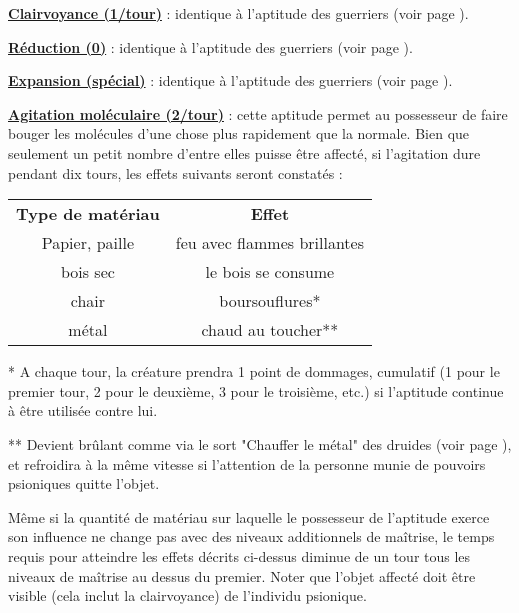 \bigskip

\textbf{\uline{Clairvoyance (1/tour)}} : identique à l'aptitude des guerriers (voir page \pageref{guerrier-clairvoyance}).

\bigskip

\textbf{\uline{Réduction (0)}} : identique à l'aptitude des guerriers (voir page \pageref{guerrier-reduction}).

\bigskip

\textbf{\uline{Expansion (spécial)}} : identique à l'aptitude des guerriers (voir page \pageref{guerrier-expansion}).

\bigskip

\label{magicien-agitation-mol}\textbf{\uline{Agitation moléculaire (2/tour)}} : cette aptitude permet au possesseur de faire bouger les molécules d'une chose plus rapidement que la normale. Bien que seulement un petit nombre d'entre elles puisse être affecté, si l'agitation dure pendant dix tours, les effets suivants seront constatés :

\medskip

\begin{tabular}{cc}
\textbf{Type de matériau}   & \textbf{Effet} \\
Papier, paille              & feu avec flammes brillantes \\
bois sec                    & le bois se consume \\
chair                       & boursouflures* \\
métal                       & chaud au toucher** \\
\end{tabular}

\bigskip

* A chaque tour, la créature prendra 1 point de dommages, cumulatif (1 pour le premier tour, 2 pour le deuxième, 3 pour le troisième, etc.) si l'aptitude continue à être utilisée contre lui.

\bigskip

** Devient brûlant comme via le sort "Chauffer le métal" des druides (voir page \pageref{sort-chauffe-metal}), et refroidira à la même vitesse si l'attention de la personne munie de pouvoirs psioniques quitte l'objet.

\bigskip

Même si la quantité de matériau sur laquelle le possesseur de l'aptitude exerce son influence ne change pas avec des niveaux additionnels de maîtrise, le temps requis pour atteindre les effets décrits ci-dessus diminue de un tour tous les niveaux de maîtrise au dessus du premier. Noter que l'objet affecté doit être visible (cela inclut la clairvoyance) de l'individu psionique.

